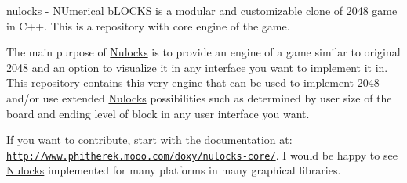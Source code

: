 nulocks -\/ N\-Umerical b\-L\-O\-C\-K\-S is a modular and customizable clone of 2048 game in C++. This is a repository with core engine of the game.

The main purpose of \hyperlink{namespace_nulocks}{Nulocks} is to provide an engine of a game similar to original 2048 and an option to visualize it in any interface you want to implement it in. This repository contains this very engine that can be used to implement 2048 and/or use extended \hyperlink{namespace_nulocks}{Nulocks} possibilities such as determined by user size of the board and ending level of block in any user interface you want.

If you want to contribute, start with the documentation at\-: \href{http://www.phitherek.mooo.com/doxy/nulocks-core/}{\tt http\-://www.\-phitherek.\-mooo.\-com/doxy/nulocks-\/core/}. I would be happy to see \hyperlink{namespace_nulocks}{Nulocks} implemented for many platforms in many graphical libraries. 